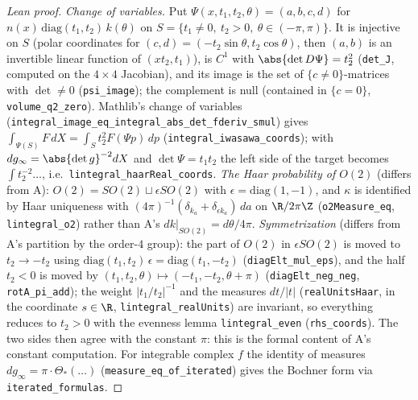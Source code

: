 \begin{proof}[Lean proof]
\emph{Change of variables.} Put $\Psi(x,t_1,t_2,\theta)=(a,b,c,d)$ for $n(x)\,\mathrm{diag}(t_1,t_2)\,k(\theta)$ on $S=\{t_1\ne0,\ t_2>0,\ \theta\in(-\pi,\pi)\}$. It is injective on $S$ (polar coordinates for $(c,d)=(-t_2\sin\theta,t_2\cos\theta)$, then $(a,b)$ is an invertible linear function of $(xt_2,t_1)$), is $C^1$ with $\abs{\det D\Psi}=t_2^2$ (\texttt{det\_J}, computed on the $4\times4$ Jacobian), and its image is the set of $\{c\ne0\}$-matrices with $\det\ne0$ (\texttt{psi\_image}); the complement is null (contained in $\{c=0\}$, \texttt{volume\_q2\_zero}). Mathlib's change of variables (\texttt{integral\_image\_eq\_integral\_abs\_det\_fderiv\_smul}) gives $\int_{\Psi(S)}F\,dX=\int_St_2^2F(\Psi p)\,dp$ (\texttt{integral\_iwasawa\_coords}); with $dg_\infty=\abs{\det g}^{-2}dX$ and $\det\Psi=t_1t_2$ the left side of the target becomes $\int t_2^{-2}\ldots$, i.e.\ \texttt{lintegral\_haarReal\_coords}. \emph{The Haar probability of $O(2)$} (differs from A): $O(2)=SO(2)\sqcup\epsilon SO(2)$ with $\epsilon=\mathrm{diag}(1,-1)$, and $\kappa$ is identified by Haar uniqueness with $(4\pi)^{-1}(\delta_{k_a}+\delta_{\epsilon k_a})\,da$ on $\R/2\pi\Z$ (\texttt{o2Measure\_eq}, \texttt{lintegral\_o2}) rather than A's $dk|_{SO(2)}=d\theta/4\pi$. \emph{Symmetrization} (differs from A's partition by the order-$4$ group): the part of $O(2)$ in $\epsilon SO(2)$ is moved to $t_2\to-t_2$ using $\mathrm{diag}(t_1,t_2)\,\epsilon=\mathrm{diag}(t_1,-t_2)$ (\texttt{diagElt\_mul\_eps}), and the half $t_2<0$ is moved by $(t_1,t_2,\theta)\mapsto(-t_1,-t_2,\theta+\pi)$ (\texttt{diagElt\_neg\_neg}, \texttt{rotA\_pi\_add}); the weight $|t_1/t_2|^{-1}$ and the measures $dt/|t|$ (\texttt{realUnitsHaar}, in the coordinate $s\in\R$, \texttt{lintegral\_realUnits}) are invariant, so everything reduces to $t_2>0$ with the evenness lemma \texttt{lintegral\_even} (\texttt{rhs\_coords}). The two sides then agree with the constant $\pi$: this is the formal content of A's constant computation. For integrable complex $f$ the identity of measures $dg_\infty=\pi\cdot\Theta_*(\ldots)$ (\texttt{measure\_eq\_of\_iterated}) gives the Bochner form via \texttt{iterated\_formulas}.
\end{proof}

